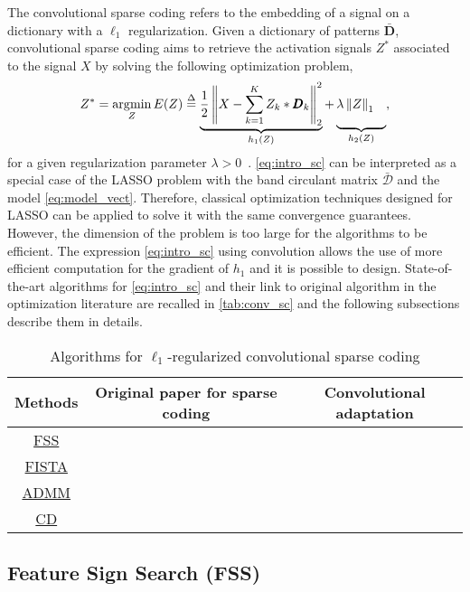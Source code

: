 \documentclass[../thesis.tex]{subfiles}
\begin{document}
	The convolutional sparse coding refers to the embedding of a signal on a dictionary
	with a $\ell_1$ regularization. Given a dictionary of patterns $\bar{\pmb D}$,
	convolutional sparse coding aims to retrieve the activation signals $Z^*$ associated
	to the signal $X$ by solving the following optimization problem,
	\begin{equation}
		\label{eq:intro_sc}
		Z^* = \operatorname*{\arg\!\min}_{Z} E(Z) \overset{\Delta}{=}
			\underbrace{\frac{1}{2} \left\|X - \sum_{k=1}^KZ_k* {\pmb D}_k\right\|_2^2}_{h_1(Z)}
			+ \underbrace{\lambda\left\|Z\right\|_1\phantom{\Bigg)}}_{h_2(Z)},
	\end{equation}
	for a given regularization parameter $\lambda > 0$~.
	\autoref{eq:intro_sc} can be interpreted as a special case of
	the LASSO problem with the band circulant matrix $\bar{\mathcal D}$ and the model
	\autoref{eq:model_vect}. Therefore, classical optimization techniques designed for
	LASSO can be applied to solve it with the same convergence guarantees. However,
	the dimension of the problem is too large for the algorithms to be efficient.
	The expression \autoref{eq:intro_sc} using convolution allows the use of more
	efficient computation for the gradient of $h_1$ and it is possible to design.
	State-of-the-art algorithms for \autoref{eq:intro_sc} and their link
	to original algorithm in the optimization literature are recalled in
	\autoref{tab:conv_sc} and the following subsections describe them in details.
	
	

\begin{table}[t]
    \centering
	\begin{tabular}{|c | c | c |}\hline
		Methods & {Original paper for sparse coding} & Convolutional adaptation\\\hline
		\hyperref[sub:fss]{FSS} & \citealt{Grosse2007} & \citealt{Lee2007} \\\hline
		\hyperref[sub:fista]{FISTA} & \citealt{Beck2009} & \citealt{Chalasani2013}\\\hline
		\hyperref[sub:admm]{ADMM} & \citealt{Gabay1976} & \citealt{Bristow2013} \\\hline
		\hyperref[sub:cd]{CD} & \citealt{Friedman2007} & \citealt{Kavukcuoglu2013} \\\hline
	\end{tabular}
	\caption{
	Algorithms for $\ell_1$-regularized convolutional sparse coding}
\label{tab:conv_sc}
\end{table}


\subsection{Feature Sign Search (FSS)}
\label{sub:fss}
\end{document}
